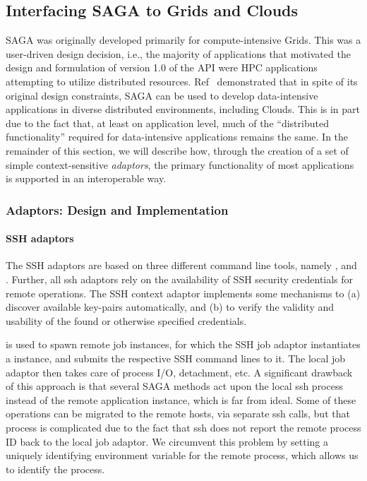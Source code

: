 \documentclass[3p,twocolumn]{elsarticle}
\begin{document}
\subsection{Interfacing SAGA to Grids and Clouds}


SAGA was originally developed primarily for compute-intensive Grids.
This was a user-driven design decision, i.e., the majority of
applications that motivated the design and formulation of version 1.0
of the API were HPC applications attempting to utilize distributed
resources.  Ref~\cite{saga_ccgrid09} demonstrated that in spite of its
original design constraints, SAGA can be used to develop
data-intensive applications in diverse distributed environments,
including Clouds.  This is in part due to the fact that, at least on
application level, much of the ``distributed functionality'' required
for data-intensive applications remains the same.  In the remainder of
this section, we will describe how, through the creation of a set of
simple context-sensitive {\it adaptors}, the primary functionality of
most applications is supported in an interoperable way.


\subsubsection{Adaptors: Design and Implementation}


\paragraph{SSH adaptors}

The SSH adaptors are based on three different command line tools,
namely \ssh, \scp and \sshfs.  Further, all ssh adaptors rely on the
availability of SSH security credentials for remote operations.  The
SSH context adaptor implements some mechanisms to (a) discover
available key-pairs automatically, and (b) to verify the validity and
usability of the found or otherwise specified credentials.
  
\ssh is used to spawn remote job instances, for which the SSH job
adaptor instantiates a   instance, and
submits the respective SSH command lines to it.  The local job adaptor
then takes care of process I/O, detachment, etc.  A significant
drawback of this approach is that several SAGA methods act upon the
local ssh process instead of the remote application instance, which is
far from ideal. Some of these operations can be migrated to the remote
hosts, via separate ssh calls, but that process is complicated due to
the fact that ssh does not report the remote process ID back to the
local job adaptor.  We circumvent this problem by setting a uniquely
identifying environment variable for the remote process, which allows
us to identify the process.
\end{document}
